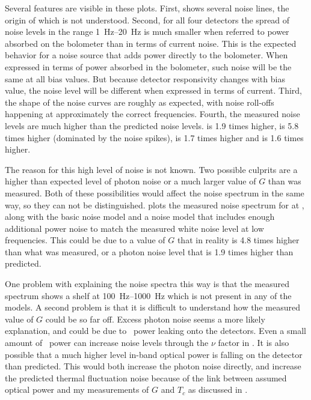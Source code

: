Several features are visible in these plots.
First,  shows several noise lines, the origin of which is not understood.
Second, for all four detectors the spread of noise levels in the range \SIrange{1}{20}{\hertz} is much smaller when referred to power absorbed on the bolometer than in terms of current noise.
This is the expected behavior for a noise source that adds power directly to the bolometer.
When expressed in terms of power absorbed in the bolometer, such noise will be the same at all bias values.
But because detector responsivity changes with bias value, the noise level will be different when expressed in terms of current.
Third, the shape of the noise curves are roughly as expected, with noise roll-offs happening at approximately the correct frequencies.
Fourth, the measured noise levels are much higher than the predicted noise levels.
 is 1.9 times higher,  is 5.8 times higher (dominated by the noise spikes),  is 1.7 times higher and  is 1.6 times higher.

The reason for this high level of noise is not known.
Two possible culprits are a higher than expected level of photon noise or a much larger value of $G$ than was measured.
Both of these possibilities would affect the noise spectrum in the same way, so they can not be distinguished.
 plots the measured noise spectrum for  at \SOC, along with the basic noise model and a noise model that includes enough additional power noise to match the measured white noise level at low frequencies.
This could be due to a value of $G$ that in reality is 4.8 times higher than what was measured, or a photon noise level that is 1.9 times higher than predicted.

One problem with explaining the noise spectra this way is that the measured spectrum shows a shelf at \SIrange{100}{1000}{\hertz} which is not present in any of the models.
A second problem is that it is difficult to understand how the measured value of $G$ could be so far off.
Excess photon noise seems a more likely explanation, and could be due to \IR\ power leaking onto the detectors.
Even a small amount of \IR\ power can increase noise levels through the $\nu$ factor in .
It is also possible that a much higher level in-band optical power is falling on the detector than predicted.
This would both increase the photon noise directly, and increase the predicted thermal fluctuation noise because of the link between assumed optical power and my measurements of $G$ and $T_c$ as discussed in .

